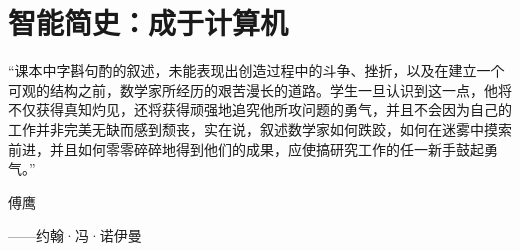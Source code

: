 \chapter{智能简史：成于计算机}



“课本中字斟句酌的叙述，未能表现出创造过程中的斗争、挫折，以及在建立一个可观的结构之前，数学家所经历的艰苦漫长的道路。学生一旦认识到这一点，他将不仅获得真知灼见，还将获得顽强地追究他所攻问题的勇气，并且不会因为自己的工作并非完美无缺而感到颓丧，实在说，叙述数学家如何跌跤，如何在迷雾中摸索前进，并且如何零零碎碎地得到他们的成果，应使搞研究工作的任一新手鼓起勇气。”
   
\begin{flushright}
                                          傅鹰
\end{flushright}


\begin{flushright}
 ------约翰·冯·诺伊曼
\end{flushright}






\newpage
